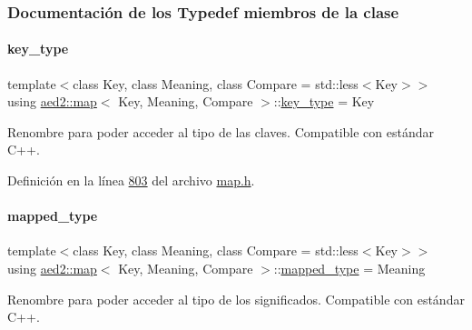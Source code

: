 \subsubsection{Documentación de los \textquotesingle{}Typedef\textquotesingle{} miembros de la clase}
\mbox{\label{classaed2_1_1map_a4273e8812e7105a618df58a2c8b72b7d_a4273e8812e7105a618df58a2c8b72b7d}} 
\paragraph{\texorpdfstring{key\+\_\+type}{key\_type}}
{\footnotesize\ttfamily template$<$class Key, class Meaning, class Compare = std\+::less$<$\+Key$>$$>$ \\
using \hyperlink{classaed2_1_1map}{aed2\+::map}$<$ Key, Meaning, Compare $>$\+::\hyperlink{classaed2_1_1map_a4273e8812e7105a618df58a2c8b72b7d_a4273e8812e7105a618df58a2c8b72b7d}{key\+\_\+type} =  Key}



Renombre para poder acceder al tipo de las claves. Compatible con estándar C++. 



Definición en la línea \hyperlink{map_8h_source_l00803}{803} del archivo \hyperlink{map_8h_source}{map.\+h}.

\mbox{\label{classaed2_1_1map_aa3e34bf624f3009884a71b18f4ddae40_aa3e34bf624f3009884a71b18f4ddae40}} 
\paragraph{\texorpdfstring{mapped\+\_\+type}{mapped\_type}}
{\footnotesize\ttfamily template$<$class Key, class Meaning, class Compare = std\+::less$<$\+Key$>$$>$ \\
using \hyperlink{classaed2_1_1map}{aed2\+::map}$<$ Key, Meaning, Compare $>$\+::\hyperlink{classaed2_1_1map_aa3e34bf624f3009884a71b18f4ddae40_aa3e34bf624f3009884a71b18f4ddae40}{mapped\+\_\+type} =  Meaning}



Renombre para poder acceder al tipo de los significados. Compatible con estándar C++. 



